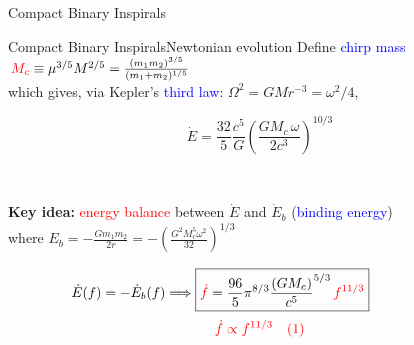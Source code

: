 \documentclass[xcolor=dvipsnames,t]{beamer}
\newcommand{\red}[1]{\textcolor{red}{#1}}
\newcommand{\bl}[1]{\textcolor{blue}{#1}}
\newcommand{\f}{\frac}
\begin{document}
\begin{frame}{Compact Binary Inspirals}
{  }
  {
  }  
\end{frame}


\begin{frame}{Compact Binary Inspirals}{Newtonian evolution}
 Define \bl{chirp mass} \hspace{1.cm} $\red{M_c} \equiv \mu^{3/5} M^{2/5} = \tfrac{(m_1 m_2)^{3/5}}{(m_1+m_2)^{1/5}}$ \\
 \vspace{1mm}
  which gives, via Kepler's \bl{third law}: $\Omega^2 = G M r^{-3}=\omega^2/4$,   
 {
  \begin{footnotesize}
  $$ \boxed{\dot{E} = \f{32}{5}\f{c^5}{G} \left(\f{G M_c\, \omega}{2c^3}\right)^{10/3}}$$
  \end{footnotesize}\\
 } 
%
  {
    {\bf Key idea:} \red{energy balance} between $\dot{E}$ and $\dot{E}_b$ (\bl{binding energy})\\
    \quad where $ E_b= -\tfrac{G m_1 m_2}{2r} = -\left(\tfrac{G^2 M_c^5 \omega^2}{32}\right)^{1/3} $
  }
%
  {
    \[ 
    \dot{E}(f) = -\dot{E}_b(f) \Longrightarrow \boxed{\red{\dot{f}} = \f{96}{5}\pi^{8/3} \f{(G M_c)}{c^5}^{5/3}\, \red{f^{11/3}} }\hspace{2cm}
    \]
    \[
    \red{ \dot{f} \propto f^{11/3}\quad(1)}
    \]
  }

\end{frame}
\end{document}
